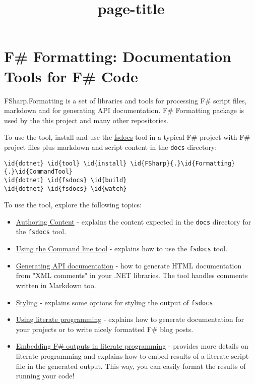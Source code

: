 \documentclass{article}
\title{{page-title}}
\date{}
\newcommand{\id}[1]{\textcolor{black}{#1}}
\begin{document}
\maketitle

\section*{F\# Formatting: Documentation Tools for F\# Code}



FSharp.Formatting is a set of libraries and tools for processing F\# script files, markdown and for
generating API documentation. F\# Formatting package is used by the this project and many other repositories.


To use the tool, install and use the \href{commandline.html}{fsdocs} tool in a typical F\# project with
F\# project files plus markdown and script content in the \texttt{docs} directory:
\begin{Verbatim}[commandchars=\\\{\}]
\id{dotnet} \id{tool} \id{install} \id{FSharp}{.}\id{Formatting}{.}\id{CommandTool}
\id{dotnet} \id{fsdocs} \id{build} 
\id{dotnet} \id{fsdocs} \id{watch}

\end{Verbatim}



To use the tool, explore the following topics:
\begin{itemize}
\item 

\href{content.html}{Authoring Content} - explains the content expected in the \texttt{docs} directory for the \texttt{fsdocs} tool.

\item 

\href{commandline.html}{Using the Command line tool} - explains how to use the \texttt{fsdocs} tool.

\item 

\href{apidocs.html}{Generating API documentation} - how to generate HTML documentation
from "XML comments" in your .NET libraries. The tool handles comments written in
Markdown too.

\item 

\href{styling.html}{Styling} - explains some options for styling the output of \texttt{fsdocs}.

\item 

\href{literate.html}{Using literate programming} - explains how to generate documentation
for your projects or to write nicely formatted F\# blog posts.

\item 

\href{evaluation.html}{Embedding F\# outputs in literate programming} - provides more details on literate programming and
explains how to embed results of a literate script file in the generated output. This way,
you can easily format the results of running your code!

\end{itemize}
\end{document}
